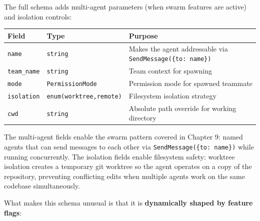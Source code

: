 \documentclass[
  english,
  11pt,
  letterpaper,
]{book}
\begin{document}
The full schema adds multi-agent parameters (when swarm features are
active) and isolation controls:

\begin{longtable}[]{@{}
  >{\raggedright\arraybackslash}p{}
  >{\raggedright\arraybackslash}p{}
  >{\raggedright\arraybackslash}p{}@{}}
\toprule\noalign{}
\begin{minipage}[b]{\linewidth}\raggedright
Field
\end{minipage} & \begin{minipage}[b]{\linewidth}\raggedright
Type
\end{minipage} & \begin{minipage}[b]{\linewidth}\raggedright
Purpose
\end{minipage} \\
\midrule\noalign{}
\endhead
\bottomrule\noalign{}
\endlastfoot
\texttt{name} & \texttt{string} & Makes the agent addressable via
\texttt{SendMessage(\{to:\ name\})} \\
\texttt{team\_name} & \texttt{string} & Team context for spawning \\
\texttt{mode} & \texttt{PermissionMode} & Permission mode for spawned
teammate \\
\texttt{isolation} &
\texttt{enum(\textquotesingle{}worktree\textquotesingle{},\textquotesingle{}remote\textquotesingle{})}
& Filesystem isolation strategy \\
\texttt{cwd} & \texttt{string} & Absolute path override for working
directory \\
\end{longtable}

The multi-agent fields enable the swarm pattern covered in Chapter 9:
named agents that can send messages to each other via
\texttt{SendMessage(\{to:\ name\})} while running concurrently. The
isolation fields enable filesystem safety: worktree isolation creates a
temporary git worktree so the agent operates on a copy of the
repository, preventing conflicting edits when multiple agents work on
the same codebase simultaneously.

What makes this schema unusual is that it is \textbf{dynamically shaped
by feature flags}:
\end{document}
